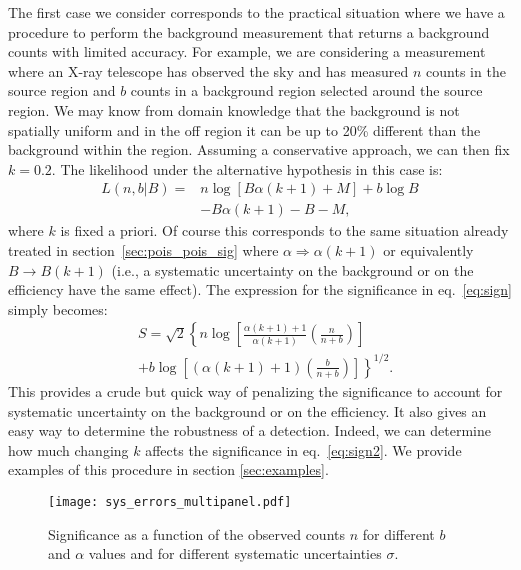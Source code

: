 \documentclass[twocolumn]{aastex61}
\begin{document}
The first case we consider corresponds to the practical situation where we have a procedure to perform the background measurement that returns a background counts with limited accuracy. For example, we are considering a measurement where an X-ray telescope has observed the sky and has measured $n$ counts in the source region and $b$ counts in a background region selected around the source region. We may know from domain knowledge that the background is not spatially uniform and in the off region it can be up to 20\% different than the background within the region. Assuming a conservative approach, we can then fix $k=0.2$. The likelihood under the alternative hypothesis in this case is:
\begin{align}
L(n, b | B) = & n \log{\left[B \alpha (k+1) + M\right]} + b \log{B}  \nonumber \\ 
& -B \alpha (k+1) - B - M, \nonumber
\end{align}
where $k$ is fixed a priori. Of course this corresponds to the same situation already treated in section~\ref{sec:pois_pois_sig} where $\alpha \Rightarrow \alpha (k+1)$ or equivalently $B \rightarrow B (k+1)$ (i.e., a systematic uncertainty on the background or on the efficiency have the same effect). The expression for the significance in eq.~\ref{eq:sign} simply becomes:
\begin{align}
& S = \sqrt{2} \left\{ n\log{\left[ \frac{\alpha (k+ 1) + 1}{\alpha (k+1)} 
\left(\frac{n}{n+b}\right)\right]} \right. \nonumber \\
& \left. + b \log{ \left[ \left(\alpha (k+1) +1\right) \left(\frac{b}{n+b} \right) \right] } \right\}^{1/2}.
\label{eq:sign2}
\end{align}
This provides a crude but quick way of penalizing the significance to account for systematic uncertainty on the background or on the efficiency. It also gives an easy way to determine the robustness of a detection. Indeed, we can determine how much changing $k$ affects the significance in eq.~\ref{eq:sign2}. We provide examples of this procedure in section \ref{sec:examples}.

\begin{figure*}[tb!]
\flushright
\texttt{[image: sys\_errors\_multipanel.pdf]}
\caption{Significance as a function of the observed counts $n$ for different $b$ and $\alpha$ values and for different systematic uncertainties $\sigma$.}
\label{fig:sys_errors}
\end{figure*}
\end{document}
